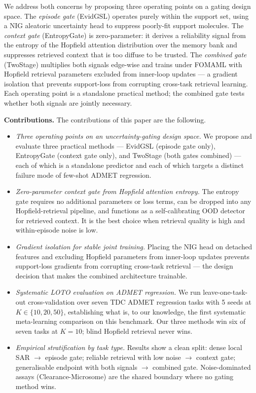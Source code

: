 \documentclass{article}
\theoremstyle{plain}
\theoremstyle{definition}
\theoremstyle{remark}
\begin{document}
We address both concerns by proposing three operating points on a gating design space. The \emph{episode gate} (EvidGSL) operates purely within the support set, using a NIG aleatoric uncertainty head to suppress poorly-fit support molecules. The \emph{context gate} (EntropyGate) is zero-parameter: it derives a reliability signal from the entropy of the Hopfield attention distribution over the memory bank and suppresses retrieved context that is too diffuse to be trusted. The \emph{combined gate} (TwoStage) multiplies both signals edge-wise and trains under FOMAML with Hopfield retrieval parameters excluded from inner-loop updates — a gradient isolation that prevents support-loss from corrupting cross-task retrieval learning. Each operating point is a standalone practical method; the combined gate tests whether both signals are jointly necessary.

\textbf{Contributions.} The contributions of this paper are the following.
\begin{itemize}
    \item \emph{Three operating points on an uncertainty-gating design space.} We propose and evaluate three practical methods — EvidGSL (episode gate only), EntropyGate (context gate only), and TwoStage (both gates combined) — each of which is a standalone predictor and each of which targets a distinct failure mode of few-shot ADMET regression.
    \item \emph{Zero-parameter context gate from Hopfield attention entropy.} The entropy gate requires no additional parameters or loss terms, can be dropped into any Hopfield-retrieval pipeline, and functions as a self-calibrating OOD detector for retrieved context. It is the best choice when retrieval quality is high and within-episode noise is low.
    \item \emph{Gradient isolation for stable joint training.} Placing the NIG head on detached features and excluding Hopfield parameters from inner-loop updates prevents support-loss gradients from corrupting cross-task retrieval — the design decision that makes the combined architecture trainable.
    \item \emph{Systematic LOTO evaluation on ADMET regression.} We run leave-one-task-out cross-validation over seven TDC ADMET regression tasks with 5 seeds at $K\!\in\!\{10,20,50\}$, establishing what is, to our knowledge, the first systematic meta-learning comparison on this benchmark. Our three methods win six of seven tasks at $K\!=\!10$; blind Hopfield retrieval never wins.
    \item \emph{Empirical stratification by task type.} Results show a clean split: dense local SAR $\to$ episode gate; reliable retrieval with low noise $\to$ context gate; generalisable endpoint with both signals $\to$ combined gate. Noise-dominated assays (Clearance-Microsome) are the shared boundary where no gating method wins.
\end{itemize}
\end{document}
